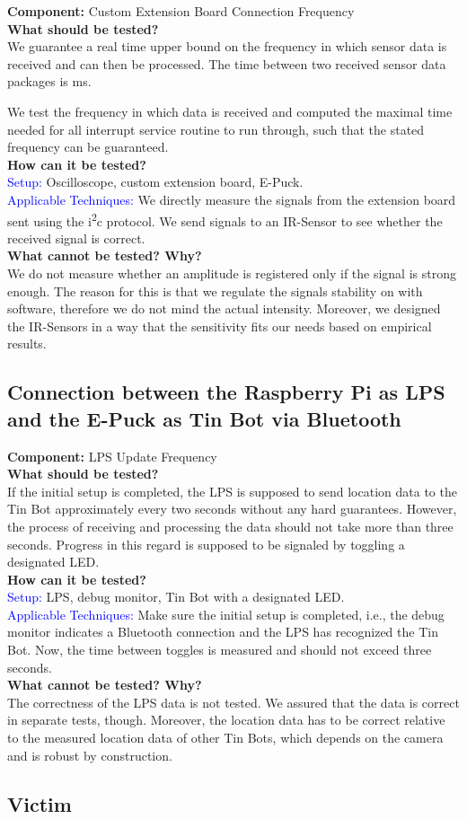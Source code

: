 \documentclass[a4paper,parskip,headheight=38pt]{scrartcl} %
\newcommand{\teststrat}[5]{
	\textbf{Component:} #1 \\
	\noindent\textbf{What should be tested?} \\
    \noindent #2 \\
	\noindent\textbf{How can it be tested?} \\
    \noindent\textcolor{blue}{Setup:} #3 \\
    \noindent\textcolor{blue}{Applicable Techniques:} #4 \\
	\noindent\textbf{What cannot be tested? Why?} \\
    \noindent #5
}
\newcommand{\ie}{i.e.}
\begin{document}
\teststrat{Custom Extension Board Connection Frequency}{
    We guarantee a real time upper bound on the frequency in which sensor data
    is received and can then be processed. The time between two received
    sensor data packages is \todo[inline]{FREQUENCY}ms.

    We test the frequency in which data is received and computed the maximal
    time needed for all interrupt service routine to run through, such that the
    stated frequency can be guaranteed.
}{
    Oscilloscope, custom extension board, E-Puck.
}{
    We directly measure the signals from the extension board sent using the
    i\textsuperscript{2}c protocol. We send signals to an IR-Sensor to see
    whether the received signal is correct.
}{
   We do not measure whether an amplitude is registered only if the signal is
   strong enough. The reason for this is that we regulate the signals stability
   on with software, therefore we do not mind the actual intensity. Moreover, we
   designed the IR-Sensors in a way that the sensitivity fits our needs based on
   empirical results.
}

\subsection{Connection between the Raspberry Pi as LPS and the E-Puck as Tin Bot
via Bluetooth}

\teststrat{LPS Update Frequency}{
    If the initial setup is completed, the LPS is supposed to send location data
    to the Tin Bot approximately every two seconds without any hard guarantees.
    However, the process of receiving and processing the data should not take
    more than three seconds. Progress in this regard is supposed to be signaled
    by toggling a designated LED.
}{
    LPS, debug monitor, Tin Bot with a designated LED.
}{
    Make sure the initial setup is completed, \ie, the debug monitor indicates a
    Bluetooth connection and the LPS has recognized the Tin Bot. Now, the time
    between toggles is measured and should not exceed three seconds.
}{
    The correctness of the LPS data is not tested. We assured that the data is
    correct in separate tests, though. Moreover, the location data has to be
    correct relative to the measured location data of other Tin Bots, which
    depends on the camera and is robust by construction.
}

\subsection{Victim}
\end{document}
